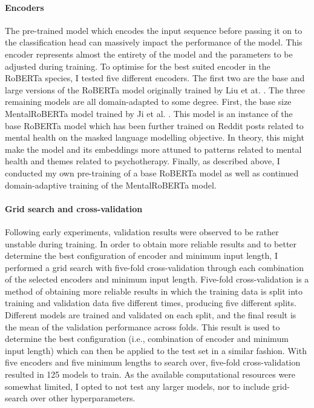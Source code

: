 \documentclass[12pt]{report}
\begin{document}
\paragraph*{Encoders}
The pre-trained model which encodes the input sequence before passing it on to the classification head can massively impact the performance of the model.
This encoder represents almost the entirety of the model and the parameters to be adjusted during training.
To optimise for the best suited encoder in the RoBERTa species, I tested five different encoders.
The first two are the base and large versions of the RoBERTa model originally trained by Liu et at. \citeyear{roberta}.
The three remaining models are all domain-adapted to some degree.
First, the base size MentalRoBERTa model trained by Ji et al. \citeyear{MentalBERT}.
This model is an instance of the base RoBERTa model which has been further trained on Reddit posts related to mental health on the masked language modelling objective.
In theory, this might make the model and its embeddings more attuned to patterns related to mental health and themes related to psychotherapy.
Finally, as described above, I conducted my own pre-training of a base RoBERTa model as well as continued domain-adaptive training of the MentalRoBERTa model.

\paragraph*{Grid search and cross-validation}
Following early experiments, validation results were observed to be rather unstable during training.
In order to obtain more reliable results and to better determine the best configuration of encoder and minimum input length, I performed a grid search with five-fold cross-validation through each combination of the selected encoders and minimum input length.
Five-fold cross-validation is a method of obtaining more reliable results in which the training data is split into training and validation data five different times, producing five different splits.
Different models are trained and validated on each split, and the final result is the mean of the validation performance across folds.
This result is used to determine the best configuration (i.e., combination of encoder and minimum input length) which can then be applied to the test set in a similar fashion.
With five encoders and five minimum lengths to search over, five-fold cross-validation resulted in 125 models to train.
As the available computational resources were somewhat limited, I opted to not test any larger models, nor to include grid-search over other hyperparameters.
\end{document}
